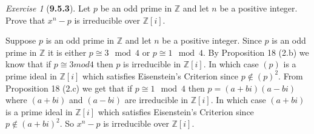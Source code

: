 \documentclass[12pt]{amsart}
\makeatletter
\theoremstyle{remark}
\newtheorem*{exercise}{Exercise}%
\def\ZZ{\ensuremath{\mathbb Z}}
\renewenvironment{proof}[1][\proofname]{\par\doublespacing
  \pushQED{\qed}%
  \normalfont \topsep6\p@\@plus6\p@\relax
  \list{}{%
    \settowidth{\leftmargin}{\itshape\proofname:\hskip\labelsep}%
    \setlength{\labelwidth}{0pt}%
    \setlength{\itemindent}{-\leftmargin}%
  }%
  \item[\hskip\labelsep\itshape#1\@addpunct{:}]\ignorespaces
}{%
  \popQED\endlist\@endpefalse
  \singlespacing
}
\theoremstyle{mycomment}
\makeatother
\begin{document}
\begin{exercise}[\textbf{9.5.3}] Let $p$ be an odd prime in $\ZZ$ and let $n$ be a positive integer. Prove that $x^n - p$ is irreducible over $\ZZ[i]$.
  \begin{proof} Suppose $p$ is an odd prime in $\ZZ$ and let $n$ be a positive integer. Since $p$ is an odd prime in $\ZZ$ it is either $p \cong 3 \mod 4$ or 
    $p \cong 1 \mod 4$. By Proposition 18 (2.b) we know that if $p \cong 3 mod 4$ then $p$ is irreducible in $\ZZ[i]$. In which case $(p)$ is a prime ideal in $\ZZ[i]$
    which satisfies Eisenstein's Criterion since $p \not\in (p)^2$. From Proposition 18 (2.c) we get that if
    $p \cong 1 \mod 4$ then $p = (a + bi)(a - bi)$ where $(a + bi)$ and $(a - bi)$ are irreducible in $\ZZ[i]$. In which case $(a + bi)$ is a prime ideal in $\ZZ[i]$
    which satisfies Eisenstein's Criterion since $p \not\in (a + bi)^2$. So $x^n - p$ is irreducible over $\ZZ[i]$.
    \end{proof}

\end{exercise}
\vspace{.5in}
\end{document}
